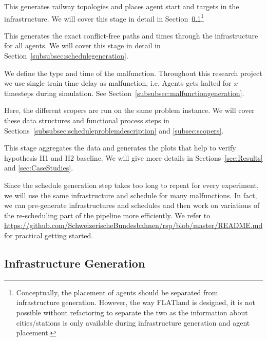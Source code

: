 \documentclass{article}
\newcounter{descriptcount}
\begin{document}
\begin{description}[%
  before={\setcounter{descriptcount}{0}},%
  ,font=\bfseries\stepcounter{descriptcount}\thedescriptcount~]
\item[Infrastructure Generation] This generates railway topologies and places agent start and targets in the infrastructure. We will cover this stage in detail in Section~\ref{subsubsec:infrastructuregeneration}\footnote{Conceptually, the placement of agents should be separated from infrastructure generation. However, the way FLATland is designed, it is not possible without refactoring to separate the two as the information about cities/stations is only available during infrastructure generation and agent placement.}
\item[Schedule Generation] This generates the exact conflict-free paths and times through the infrastructure for all agents. We will cover this stage in detail in Section~\ref{subsubsec:schedulegeneration}.
\item[Malfunction Generation] We define the type and time of the malfunction. Throughout this research project we use single train time delay as malfunction, i.e. Agents gets halted for $x$ timesteps during simulation. See Section~\ref{subsubsec:malfunctiongeneration}.
\item[Experiment Run] Here, the different scopers are run on the same problem instance. We will cover these data structures and functional process steps in Sections~\ref{subsubsec:scheduleproblemdescription} and \ref{subsec:scopers}.
\item[Experiment Analysis] This stage aggregates the data and generates the plots that help to verify hypothesis H1 and H2 baseline. We will give more details in Sections~\ref{sec:Results} and \ref{sec:CaseStudies}.
\end{description}
Since the schedule generation step takes too long to repeat for every experiment, we will use the same infrastructure and schedule for many malfunctions. In fact, we can pre-generate infrastructures and schedules and then work on variations of the re-scheduling part of the pipeline more efficiently. We refer to \url{https://github.com/SchweizerischeBundesbahnen/rsp/blob/master/README.md} for practical getting started.



\subsection{Infrastructure Generation}\label{subsubsec:infrastructuregeneration}
\end{document}
